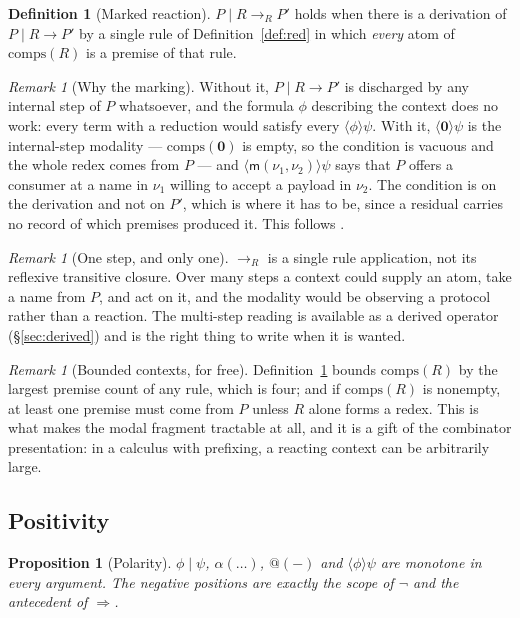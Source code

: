 \documentclass[11pt]{article}
\makeatletter
\theoremstyle{plain}
\newtheorem{proposition}[theorem]{Proposition}
\theoremstyle{definition}
\newtheorem{definition}[theorem]{Definition}
\theoremstyle{remark}
\newtheorem{remark}[theorem]{Remark}
\newcommand{\quo}[1]{@#1}
\newcommand{\nil}{\mathbf{0}}
\newcommand{\mm}{\mathsf{m}}
\newcommand{\red}{\longrightarrow}
\newcommand{\may}[1]{\langle #1 \rangle}
\newcommand{\comps}[1]{\mathrm{comps}(#1)}
\makeatother
\begin{document}
\begin{definition}[Marked reaction]
\label{def:marked}
$P \mid R \red_{R} P'$ holds when there is a derivation of
$P \mid R \red P'$ by a single rule of Definition~\ref{def:red} in which
\emph{every} atom of $\comps{R}$ is a premise of that rule.
\end{definition}

\begin{remark}[Why the marking]
\label{rem:whymark}
Without it, $P \mid R \red P'$ is discharged by any internal step of $P$
whatsoever, and the formula $\phi$ describing the context does no work: every
term with a reduction would satisfy every $\may{\phi}\psi$. With it,
$\may{\nil}\psi$ is the internal-step modality --- $\comps{\nil}$ is empty, so
the condition is vacuous and the whole redex comes from $P$ --- and
$\may{\mm(\nu_1,\nu_2)}\psi$ says that $P$ offers a consumer at a name in
$\nu_1$ willing to accept a payload in $\nu_2$. The condition is on the
derivation and not on $P'$, which is where it has to be, since a residual
carries no record of which premises produced it. This follows
\cite[Def.~5.4]{softwhere}.
\end{remark}

\begin{remark}[One step, and only one]
$\red_{R}$ is a single rule application, not its reflexive transitive closure.
Over many steps a context could supply an atom, take a name from $P$, and act on
it, and the modality would be observing a protocol rather than a reaction. The
multi-step reading is available as a derived operator
(\S\ref{sec:derived}) and is the right thing to write when it is wanted.
\end{remark}

\begin{remark}[Bounded contexts, for free]
\label{rem:bdd}
Definition~\ref{def:marked} bounds $\comps{R}$ by the largest premise count of
any rule, which is four; and if $\comps{R}$ is nonempty, at least one premise
must come from $P$ unless $R$ alone forms a redex. This is what makes the modal
fragment tractable at all, and it is a gift of the combinator presentation: in a
calculus with prefixing, a reacting context can be arbitrarily large.
\end{remark}

\subsection{Positivity}

\begin{proposition}[Polarity]
\label{prop:polarity}
$\phi \mid \psi$, $\alpha(\dots)$, $\quo{(-)}$ and $\may{\phi}\psi$ are monotone
in every argument. The negative positions are exactly the scope of $\neg$ and
the antecedent of $\Rightarrow$.
\end{proposition}
\end{document}
